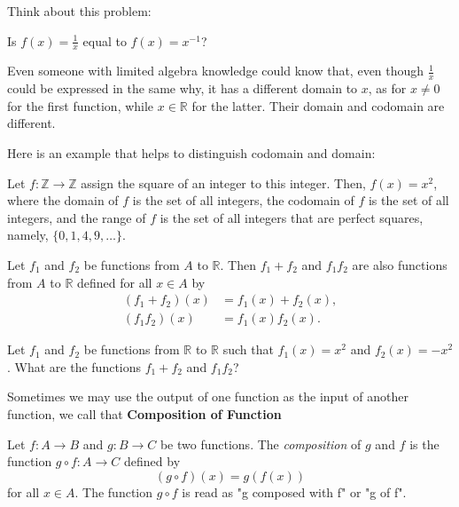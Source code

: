 Think about this problem:
\begin{problem}
    Is $f(x) = \frac{1}{x}$ equal to $f(x) = x^{-1} $?
\end{problem}
\begin{solution}
Even someone with limited algebra knowledge could know that, even though $\frac{1} {x}$ could be expressed in the same why, it has a different domain to $x$, as for $x \neq 0$ for the first function, while $x\in \mathbb{R}$ for the latter. Their domain and codomain are different.
\end{solution}

Here is an example that helps to distinguish codomain and domain:
\begin{example}
    Let \( f: \mathbb{Z} \rightarrow \mathbb{Z} \) assign the square of an integer to this integer. Then, \( f(x) = x^2 \), where the domain of \( f \) is the set of all integers, the codomain of \( f \) is the set of all integers, and the range of \( f \) is the set of all integers that are perfect squares, namely, \( \{0, 1, 4, 9, \ldots \} \).
\end{example}

\begin{theorem}
Let \( f_1 \) and \( f_2 \) be functions from \( A \) to \( \mathbb{R} \). Then \( f_1 + f_2 \) and \( f_1f_2 \) are also functions from \( A \) to \( \mathbb{R} \) defined for all \( x \in A \) by
\begin{align*}
    (f_1 + f_2)(x) &= f_1(x) + f_2(x), \\
    (f_1f_2)(x) &= f_1(x)f_2(x).
\end{align*}
\end{theorem}
\begin{problem}
    Let \( f_1 \) and \( f_2 \) be functions from \( \mathbb{R} \) to \( \mathbb{R} \) such that \( f_1(x) = x^2 \) and \( f_2(x) = -x^2 \). What are the functions \( f_1 + f_2 \) and \( f_1f_2 \)?
\end{problem}




Sometimes we may use the output of one function as the input of another function, we call that \textbf{Composition of
Function}
\begin{definition}
	Let $f: A \rightarrow B$ and $g: B \rightarrow C$ be two functions. The \emph{composition} of $g$ and $f$ is the function $g \circ f: A \rightarrow C$ defined by
	\[
	(g \circ f)(x) = g(f(x))
	\]
	for all $x \in A$. The function $g \circ f$ is read as "g composed with f" or "g of f".
	\end{definition}


